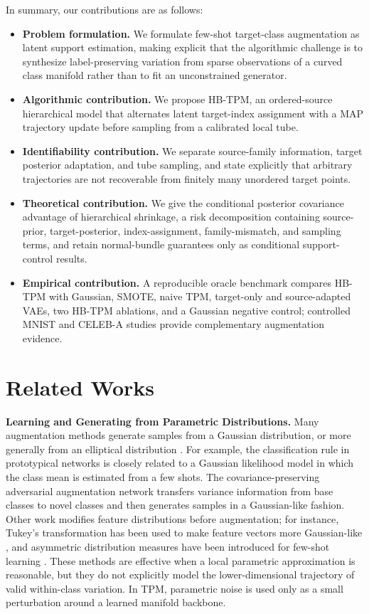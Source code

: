 \documentclass{article}
\begin{document}
In summary, our contributions are as follows: 
\begin{itemize}
	\item \textbf{Problem formulation.} We formulate few-shot target-class augmentation as latent support estimation, making explicit that the algorithmic challenge is to synthesize label-preserving variation from sparse observations of a curved class manifold rather than to fit an unconstrained generator.
	
	\item \textbf{Algorithmic contribution.} We propose HB-TPM, an ordered-source hierarchical model that alternates latent target-index assignment with a MAP trajectory update before sampling from a calibrated local tube.

	\item \textbf{Identifiability contribution.} We separate source-family information, target posterior adaptation, and tube sampling, and state explicitly that arbitrary trajectories are not recoverable from finitely many unordered target points.

	\item \textbf{Theoretical contribution.} We give the conditional posterior covariance advantage of hierarchical shrinkage, a risk decomposition containing source-prior, target-posterior, index-assignment, family-mismatch, and sampling terms, and retain normal-bundle guarantees only as conditional support-control results.

    \item \textbf{Empirical contribution.} A reproducible oracle benchmark compares HB-TPM with Gaussian, SMOTE, naive TPM, target-only and source-adapted VAEs, two HB-TPM ablations, and a Gaussian negative control; controlled MNIST and CELEB-A studies provide complementary augmentation evidence.
\end{itemize}

\section{Related Works}
\textbf{Learning and Generating from Parametric Distributions.} Many augmentation methods generate samples from a Gaussian distribution, or more generally from an elliptical distribution \citep{mao2019homography, meer2004robust}. For example, the classification rule in prototypical networks \citep{snell2017prototypical} is closely related to a Gaussian likelihood model in which the class mean is estimated from a few shots. The covariance-preserving adversarial augmentation network \citep{gao2018low} transfers variance information from base classes to novel classes and then generates samples in a Gaussian-like fashion. Other work modifies feature distributions before augmentation; for instance, Tukey's transformation has been used to make feature vectors more Gaussian-like \citep{yang2021free}, and asymmetric distribution measures have been introduced for few-shot learning \citep{li2020asymmetric}. These methods are effective when a local parametric approximation is reasonable, but they do not explicitly model the lower-dimensional trajectory of valid within-class variation. In TPM, parametric noise is used only as a small perturbation around a learned manifold backbone.
\end{document}
